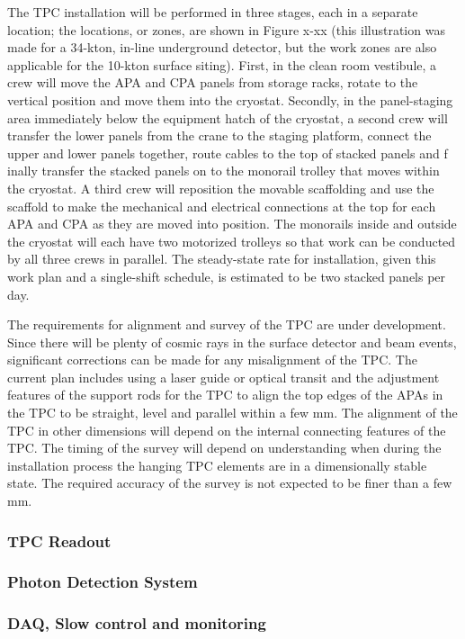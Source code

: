   The TPC installation will be performed in three stages, each in a separate location; the locations, or 
  zones, are shown in Figure x-xx (this illustration was made for a 34-kton, in-line underground 
  detector, but the work zones are also applicable for the 10-kton surface siting). First, in the clean room 
  vestibule, a crew will move the APA and CPA panels from storage racks, rotate to the vertical position 
  and move them into the cryostat. Secondly, in the panel-staging area immediately below the equipment 
  hatch of the cryostat, a second crew will transfer the lower panels from the crane to the staging 
  platform, connect the upper and lower panels together, route cables to the top of stacked panels and f
  inally transfer the stacked panels on to the monorail trolley that moves within the cryostat. A third crew 
  will reposition the movable scaffolding and use the scaffold to make the mechanical and electrical 
  connections at the top for each APA and CPA as they are moved into position. The monorails inside and 
  outside the cryostat will each have two motorized trolleys so that work can be conducted by all three 
  crews in parallel. The steady-state rate for installation, given this work plan and a single-shift schedule, 
  is estimated to be two stacked panels per day.  

The requirements for alignment and survey of the TPC are under development. Since there will be plenty 
of cosmic rays in the surface detector and beam events, significant corrections can be made for any 
misalignment of the TPC. The current plan includes using a laser guide or optical transit and the 
adjustment features of the support rods for the TPC to align the top edges of the APAs in the TPC to be 
straight, level and parallel within a few mm. The alignment of the TPC in other dimensions will depend on 
the internal connecting features of the TPC.  The timing of the survey will depend on understanding when 
during the installation process the hanging TPC elements are in a dimensionally stable state. The 
required accuracy of the survey is not expected to be finer than a few mm.  




\subsubsection{TPC Readout}



\subsubsection{Photon Detection System}


\subsubsection{DAQ, Slow control and monitoring}





